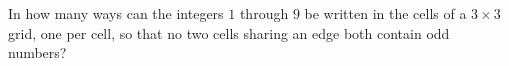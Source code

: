 In how many ways can the integers $1$ through $9$ be written in the cells of a $3\times3$ grid, one per cell, so that no two cells sharing an edge both contain odd numbers?
